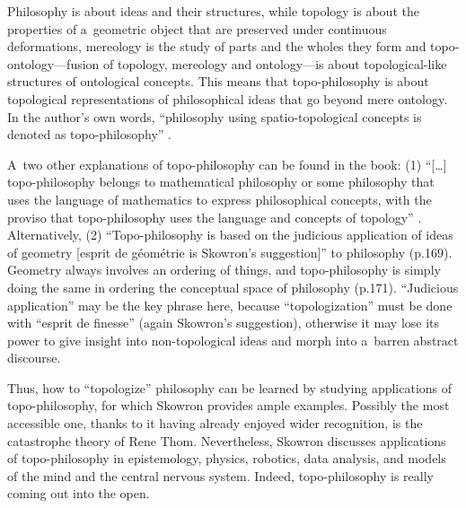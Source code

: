 Philosophy is about ideas and their structures, while topology is about the properties of a~geometric object that are preserved under continuous deformations, mereology is the study of parts and the wholes they form and topo-ontology---fusion of topology, mereology and ontology---is about topological-like structures of ontological concepts. This means that topo-philosophy is about topological representations of philosophical ideas that go beyond mere ontology. In the author's own words, ``philosophy using spatio-topological concepts is denoted as topo-philosophy'' 
\parencite[][p.xi]{skowron_czesc_2021}.%




A~two other explanations of topo-philosophy can be found in the book: (1) ``[…] topo-philosophy belongs to mathematical philosophy or some philosophy that uses the language of mathematics to express philosophical concepts, with the proviso that topo-philosophy uses the language and concepts of topology'' 
\parencite[][p.153]{skowron_czesc_2021}. %
 Alternatively, (2) ``Topo-philosophy is based on the judicious application of ideas of geometry [esprit de géométrie is Skowron's suggestion]'' to philosophy (p.169). Geometry always involves an ordering of things, and topo-philosophy is simply doing the same in ordering the conceptual space of philosophy (p.171). ``Judicious application'' may be the key phrase here, because ``topologization'' must be done with ``esprit de finesse'' (again Skowron's suggestion), otherwise it may lose its power to give insight into non-topological ideas and morph into a~barren abstract discourse.



Thus, how to ``topologize'' philosophy can be learned by studying applications of topo-philosophy, for which Skowron provides ample examples. Possibly the most accessible one, thanks to it having already enjoyed wider recognition, is the catastrophe theory of Rene Thom. Nevertheless, Skowron discusses applications of topo-philosophy in epistemology, physics, robotics, data analysis, and models of the mind and the central nervous system. Indeed, topo-philosophy is really coming out into the open.



